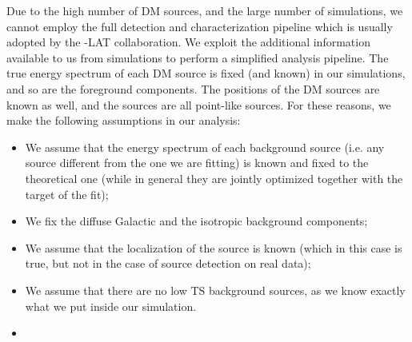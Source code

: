 Due to the high number of DM sources, and the large number of simulations, we cannot employ the full detection and characterization pipeline which is usually adopted by the \Fermi-LAT collaboration.
We exploit the additional information available to us from simulations to perform a simplified analysis pipeline. 
The true energy spectrum of each DM source is fixed (and known) in our simulations, and so are the foreground components. The positions of the DM sources are known as well, and the sources are all point-like sources. For these reasons, we make the following assumptions in our analysis:
\begin{itemize}
    \item We assume that the energy spectrum of each background source (i.e. any source different from the one we are fitting) is known and fixed to the theoretical one (while in general they are jointly optimized together with the target of the fit);
    \item We fix the diffuse Galactic and the isotropic background components;
    \item We assume that the localization of the source is known (which in this case is true, but not in the case of source detection on real data);
    \item We assume that there are no low TS background sources, as we know exactly what we put inside our simulation.
    \item {}
\end{itemize}

